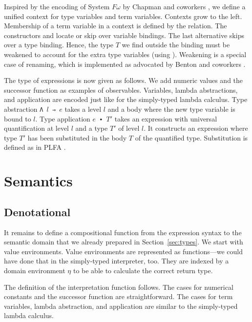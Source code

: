 \documentclass[acmsmall,anonymous,review,screen]{acmart}
\begin{document}
Inspired by the encoding of System $F\omega$ by Chapman and coworkers
\cite{DBLP:conf/mpc/ChapmanKNW19}, we define a 
unified context for type variables and term variables. Contexts grow to the left.
\TFTVEnv
Membership of a term variable in a context is defined by the
{\Ainn} relation.
\TFinn
The constructors {\Ahere} and {\Athere} locate or skip over variable bindings.
The last alternative {\Atskip} skips over a type binding. Hence, the type
$T$ we find outside the binding must be weakened to account for the
extra type variables (using {\ATwk}). Weakening is a special case of renaming, which
is implemented as advocated by Benton and coworkers \cite{DBLP:journals/jar/BentonHKM12}.

The type of expressions is now given as follows.
\TFExpr
We add numeric values and the successor function as examples of observables.
Variables, lambda abstractions, and application are encoded just like
for the simply-typed lambda calculus.
Type abstraction \texttt{Λ $l$ ⇒ $e$} takes a level $l$ and a body where the new type
variable is bound to $l$. 
Type application \texttt{$e$ ∙ $T'$} takes an expression with universal quantification at
level $l$ and a type $T'$ of level $l$. It constructs an expression
where type $T'$ has been substituted in the body $T$ of the
quantified type. Substitution is defined as in PLFA
\cite{DBLP:journals/jar/BentonHKM12,DBLP:journals/scp/KokkeSW20}. 

\section{Semantics}
\label{sec:semantics}

\subsection{Denotational}
\label{sec:denotational}



It remains to define a compositional function from the expression
syntax to the semantic domain that we already prepared in
Section~\ref{sec:types}. We start with value environments.
\TFVEnv
Value environments are represented as functions---we could have done
that in the simply-typed interpreter, too. They are indexed by a
domain environment $\eta$ to be able to calculate the correct return type.

The definition of the interpretation function follows.
\TFExprSem
The cases for numerical constants and the successor function are straightforward.
The cases for term variables, lambda abstraction, and application are
similar to the  simply-typed lambda calculus.
\end{document}
